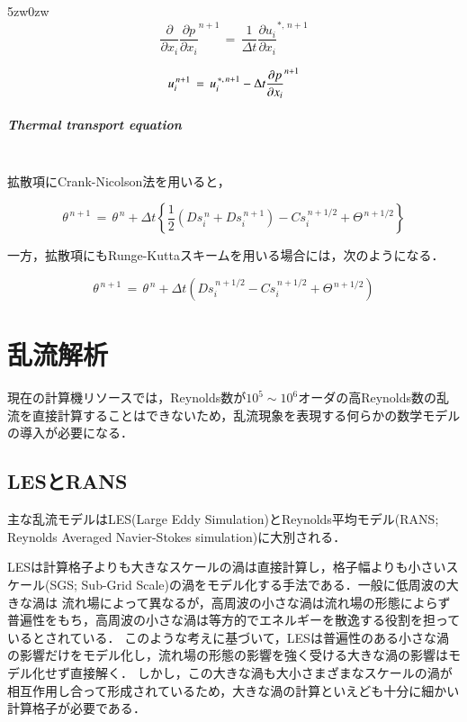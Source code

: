 \begin{indentation}{5zw}{0zw}
\begin{equation}
\frac{\partial}{\partial x_i} {\frac{\partial p}{\partial x_i}}^{n+1}
\,=\,
\frac{1}{\Delta t} {\frac{\partial u_i}{\partial x_i}}^{*,\,n+1}
\label{eq:Poisson RKCN corrector}
\end{equation}

\begin{equation}
u_i^{\,n+1} \,=\, u_i^{\,*,\,n+1} - \Delta t {\frac{\partial p}{\partial x_i}}^{n+1} \vspace{1mm}
\label{eq:Pressure correction RKCN corrector}
\end{equation}


\subparagraph{Thermal transport equation} $\mbox{}$\\
拡散項にCrank-Nicolson法を用いると，

\begin{equation}
\theta^{\,n+1} \,=\, \theta^{\,n} + \Delta t \left\{ \frac{1}{2} \left( Ds_i^{\,n} + Ds_i^{\,n+1} \right) - Cs_i^{\,n+1/2} + \Theta^{\,n+1/2} \right\}
\label{eq:thermal transport RKCN corrector2}
\end{equation}

\noindent 一方，拡散項にもRunge-Kuttaスキームを用いる場合には，次のようになる．

\begin{equation}
\theta^{\,n+1} \,=\, \theta^{\,n} + \Delta t \left( Ds_i^{\,n+1/2} - Cs_i^{\,n+1/2} + \Theta^{\,n+1/2} \right)
\label{eq:thermal transport RKCN corrector1}
\end{equation}

\end{indentation}


\pagebreak
%
\section{乱流解析}
現在の計算機リソースでは，Reynolds数が$10^5\sim10^6$オーダの高Reynolds数の乱流を直接計算することはできないため，乱流現象を表現する何らかの数学モデルの導入が必要になる．

%
\subsection{LESとRANS}
主な乱流モデルはLES(Large Eddy Simulation)とReynolds平均モデル(RANS; Reynolds Averaged Navier-Stokes simulation)に大別される．

LESは計算格子よりも大きなスケールの渦は直接計算し，格子幅よりも小さいスケール(SGS; Sub-Grid Scale)の渦をモデル化する手法である．一般に低周波の大きな渦は 流れ場によって異なるが，高周波の小さな渦は流れ場の形態によらず普遍性をもち，高周波の小さな渦は等方的でエネルギーを散逸する役割を担っているとされている．
このような考えに基づいて，LESは普遍性のある小さな渦の影響だけをモデル化し，流れ場の形態の影響を強く受ける大きな渦の影響はモデル化せず直接解く．
しかし，この大きな渦も大小さまざまなスケールの渦が相互作用し合って形成されているため，大きな渦の計算といえども十分に細かい計算格子が必要である\cite{kajishima:99:simulation}．

